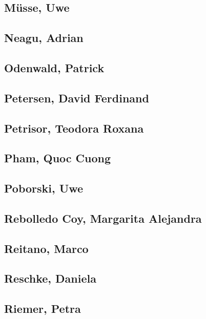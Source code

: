 \subsection{Müsse, Uwe}\label{muxfcsse-uwe}

\subsection{Neagu, Adrian}\label{neagu-adrian}

\subsection{Odenwald, Patrick}\label{odenwald-patrick}

\subsection{Petersen, David
Ferdinand}\label{petersen-david-ferdinand}

\subsection{Petrisor, Teodora Roxana}\label{petrisor-teodora-roxana}

\subsection{Pham, Quoc Cuong}\label{pham-quoc-cuong}

\subsection{Poborski, Uwe}\label{poborski-uwe}

\subsection{Rebolledo Coy, Margarita
Alejandra}\label{rebolledo-coy-margarita-alejandra}

\subsection{Reitano, Marco}\label{reitano-marco}

\subsection{Reschke, Daniela}\label{reschke-daniela}

\subsection{Riemer, Petra}\label{riemer-petra}


